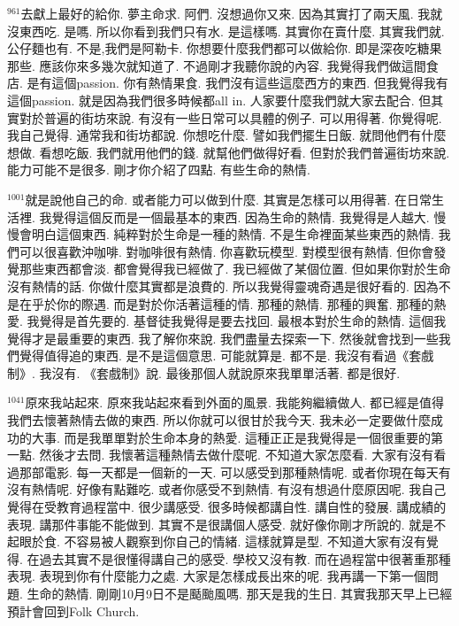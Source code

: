 \documentclass{book}
\begin{document}
$^{961}$去獻上最好的給你.
夢主命求.
阿們.
沒想過你又來.
因為其實打了兩天風.
我就沒東西吃.
是嗎.
所以你看到我們只有水.
是這樣嗎.
其實你在賣什麼.
其實我們就.
公仔麵也有.
不是,我們是阿勒卡.
你想要什麼我們都可以做給你.
即是深夜吃糖果那些.
應該你來多幾次就知道了.
不過剛才我聽你說的內容.
我覺得我們做這間食店.
是有這個passion.
你有熱情果食.
我們沒有這些這麼西方的東西.
但我覺得我有這個passion.
就是因為我們很多時候都all in.
人家要什麼我們就大家去配合.
但其實對於普遍的街坊來說.
有沒有一些日常可以具體的例子.
可以用得著.
你覺得呢.
我自己覺得.
通常我和街坊都說.
你想吃什麼.
譬如我們擺生日飯.
就問他們有什麼想做.
看想吃飯.
我們就用他們的錢.
就幫他們做得好看.
但對於我們普遍街坊來說.
能力可能不是很多.
剛才你介紹了四點.
有些生命的熱情.

$^{1001}$就是說他自己的命.
或者能力可以做到什麼.
其實是怎樣可以用得著.
在日常生活裡.
我覺得這個反而是一個最基本的東西.
因為生命的熱情.
我覺得是人越大.
慢慢會明白這個東西.
純粹對於生命是一種的熱情.
不是生命裡面某些東西的熱情.
我們可以很喜歡沖咖啡.
對咖啡很有熱情.
你喜歡玩模型.
對模型很有熱情.
但你會發覺那些東西都會淡.
都會覺得我已經做了.
我已經做了某個位置.
但如果你對於生命沒有熱情的話.
你做什麼其實都是浪費的.
所以我覺得靈魂奇遇是很好看的.
因為不是在乎於你的際遇.
而是對於你活著這種的情.
那種的熱情.
那種的興奮.
那種的熱愛.
我覺得是首先要的.
基督徒我覺得是要去找回.
最根本對於生命的熱情.
這個我覺得才是最重要的東西.
我了解你來說.
我們盡量去探索一下.
然後就會找到一些我們覺得值得追的東西.
是不是這個意思.
可能就算是.
都不是.
我沒有看過《套戲制》.
我沒有.
《套戲制》說.
最後那個人就說原來我單單活著.
都是很好.

$^{1041}$原來我站起來.
原來我站起來看到外面的風景.
我能夠繼續做人.
都已經是值得我們去懷著熱情去做的東西.
所以你就可以很甘於我今天.
我未必一定要做什麼成功的大事.
而是我單單對於生命本身的熱愛.
這種正正是我覺得是一個很重要的第一點.
然後才去問.
我懷著這種熱情去做什麼呢.
不知道大家怎麼看.
大家有沒有看過那部電影.
每一天都是一個新的一天.
可以感受到那種熱情呢.
或者你現在每天有沒有熱情呢.
好像有點難吃.
或者你感受不到熱情.
有沒有想過什麼原因呢.
我自己覺得在受教育過程當中.
很少講感受.
很多時候都講自性.
講自性的發展.
講成績的表現.
講那件事能不能做到.
其實不是很講個人感受.
就好像你剛才所說的.
就是不起眼於食.
不容易被人觀察到你自己的情緒.
這樣就算是型.
不知道大家有沒有覺得.
在過去其實不是很懂得講自己的感受.
學校又沒有教.
而在過程當中很著重那種表現.
表現到你有什麼能力之處.
大家是怎樣成長出來的呢.
我再講一下第一個問題.
生命的熱情.
剛剛10月9日不是颳颱風嗎.
那天是我的生日.
其實我那天早上已經預計會回到Folk Church.
\end{document}
